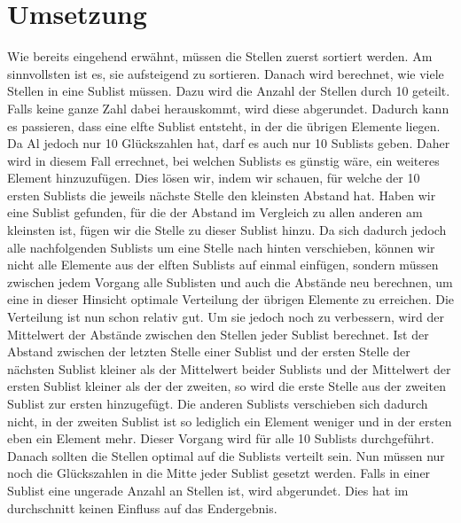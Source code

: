 \documentclass[a4paper,10pt,ngerman]{scrartcl}
\begin{document}
\section{Umsetzung}
Wie bereits eingehend erwähnt, müssen die Stellen zuerst sortiert werden. Am sinnvollsten ist es, sie aufsteigend zu sortieren. Danach wird berechnet, wie viele Stellen in eine Sublist müssen. Dazu wird die Anzahl der Stellen durch 10 geteilt. Falls keine ganze Zahl dabei herauskommt, wird diese abgerundet. Dadurch kann es passieren, dass eine elfte Sublist entsteht, in der die übrigen Elemente liegen. Da Al jedoch nur 10 Glückszahlen hat, darf es auch nur 10 Sublists geben. Daher wird in diesem Fall errechnet, bei welchen Sublists es günstig wäre, ein weiteres Element hinzuzufügen. Dies lösen wir, indem wir schauen, für welche der 10 ersten Sublists die jeweils nächste Stelle den kleinsten Abstand hat. Haben wir eine Sublist gefunden, für die der Abstand im Vergleich zu allen anderen am kleinsten ist, fügen wir die Stelle zu dieser Sublist hinzu. Da sich dadurch jedoch alle nachfolgenden Sublists um eine Stelle nach hinten verschieben, können wir nicht alle Elemente aus der elften Sublists auf einmal einfügen, sondern müssen zwischen jedem Vorgang alle Sublisten und auch die Abstände neu berechnen, um eine in dieser Hinsicht optimale Verteilung der übrigen Elemente zu erreichen. Die Verteilung ist nun schon relativ gut. Um sie jedoch noch zu verbessern, wird der Mittelwert der Abstände zwischen den Stellen jeder Sublist berechnet. Ist der Abstand zwischen der letzten Stelle einer Sublist und der ersten Stelle der nächsten Sublist kleiner als der Mittelwert beider Sublists und der Mittelwert der ersten Sublist kleiner als der der zweiten, so wird die erste Stelle aus der zweiten Sublist zur ersten hinzugefügt. Die anderen Sublists verschieben sich dadurch nicht, in der zweiten Sublist ist so lediglich ein Element weniger und in der ersten eben ein Element mehr. Dieser Vorgang wird für alle 10 Sublists durchgeführt. Danach sollten die Stellen optimal auf die Sublists verteilt sein. Nun müssen nur noch die Glückszahlen in die Mitte jeder Sublist gesetzt werden. Falls in einer Sublist eine ungerade Anzahl an Stellen ist, wird abgerundet. Dies hat im durchschnitt keinen Einfluss auf das Endergebnis.
\end{document}
